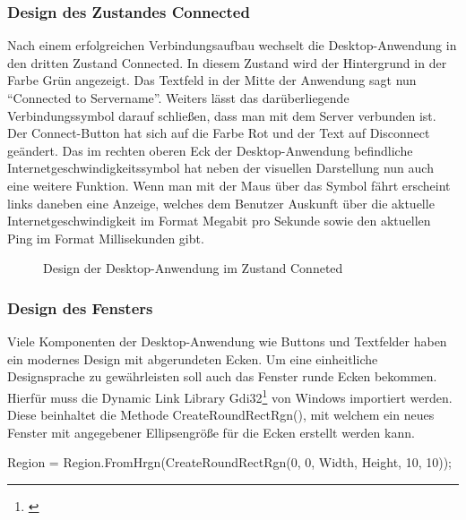 \subsubsection{Design des Zustandes Connected}

Nach einem erfolgreichen Verbindungsaufbau wechselt die Desktop-Anwendung in den dritten Zustand Connected. In diesem Zustand wird der Hintergrund in der Farbe Grün angezeigt. Das Textfeld in der Mitte der Anwendung sagt nun “Connected to Servername”. Weiters lässt das darüberliegende Verbindungssymbol darauf schließen, dass man mit dem Server verbunden ist. Der Connect-Button hat sich auf die Farbe Rot und der Text auf Disconnect geändert. Das im rechten oberen Eck der Desktop-Anwendung befindliche Internetgeschwindigkeitssymbol hat neben der visuellen Darstellung nun auch eine weitere Funktion. Wenn man mit der Maus über das Symbol fährt erscheint links daneben eine Anzeige, welches dem Benutzer Auskunft über die aktuelle Internetgeschwindigkeit im Format Megabit pro Sekunde sowie den aktuellen Ping im Format Millisekunden gibt.
\\
\begin{figure}[H]
    \centering
    \setlength{\fboxsep}{1pt}
	\setlength{\fboxrule}{1pt}
    \caption{Design der Desktop-Anwendung im Zustand Conneted} 
\end{figure}

\subsubsection{Design des Fensters}

Viele Komponenten der Desktop-Anwendung wie Buttons und Textfelder haben ein modernes Design mit abgerundeten Ecken. Um eine einheitliche Designsprache zu gewährleisten soll auch das Fenster runde Ecken bekommen. Hierfür muss die Dynamic Link Library Gdi32\footnote[1]{\cite[Vgl.][]{GDI}} von Windows importiert werden. Diese beinhaltet die Methode \mbox{CreateRoundRectRgn()}, mit welchem ein neues Fenster mit angegebener Ellipsengröße für die Ecken erstellt werden kann.

\begin{program}[H]
\begin{CSharpCode}
Region = Region.FromHrgn(CreateRoundRectRgn(0, 0, Width, Height, 10, 10));
\end{CSharpCode}
\caption{Erstellen eines neuen Fensters mit abgerundeten Ecken}
\end{program}

